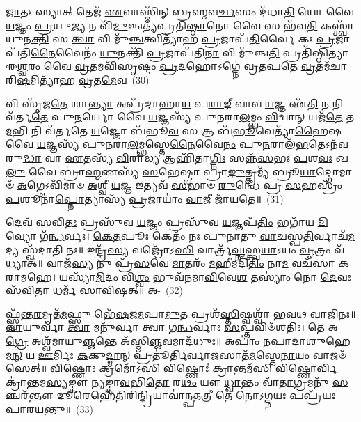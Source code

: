 \-\ul{𑌜𑌾}\-𑌤𑌃 𑌸𑍍𑌯𑌾𑌤𑍍 𑌤𑍇𑌜᳴ \ul{𑌏}\-𑌵𑌾𑌸𑍍𑌮𑌿᳴𑌨𑍍 𑌬𑍍𑌰𑌹𑍍𑌮𑌵\-\ul{𑌰𑍍𑌚}\-𑌸𑌂 𑌦᳴𑌧𑌾\-\ul{𑌤𑌿} 𑌯𑍋 𑌵𑍈 \ul{𑌯}\-𑌜𑍍𑌞𑌂 \ul{𑌪𑍍𑌰}\-𑌯𑍁\-\ul{𑌜𑍍𑌯} 𑌨 𑌵𑌿᳴\-\ul{𑌮𑍁}\-𑌞𑍍𑌚𑌤𑍍𑌯᳴𑌪𑍍𑌰𑌤𑌿\-\ul{𑌷𑍍𑌠𑌾}\-𑌨𑍋 𑌵𑍈 𑌸 𑌭᳴𑌵\-\ul{𑌤𑌿} 𑌕𑌸𑍍𑌤𑍍𑌵𑌾᳴ 𑌯𑍁𑌨\-\ul{𑌕𑍍𑌤𑌿} 𑌸 \ul{𑌤𑍍𑌵𑌾} 𑌵𑌿 𑌮𑍁᳴\-\ul{𑌞𑍍𑌚}\-𑌤𑍍𑌵𑌿𑌤𑍍𑌯𑌾᳴𑌹 \ul{𑌪𑍍𑌰}\-𑌜𑌾𑌪᳴\-\ul{𑌤𑌿}\-𑌰𑍍𑌵𑍈 𑌕𑌃 \ul{𑌪𑍍𑌰}\-𑌜𑌾𑌪᳴𑌤𑌿\-\ul{𑌨𑍈}\-𑌵𑍈𑌨𑌂᳴ \ul{𑌯𑍁}\-𑌨𑌕𑍍𑌤𑌿᳴ \ul{𑌪𑍍𑌰}\-𑌜𑌾𑌪᳴𑌤𑌿\-\ul{𑌨𑌾} 𑌵𑌿 𑌮𑍁᳴𑌞𑍍𑌚\-\ul{𑌤𑌿} 𑌪𑍍𑌰𑌤𑌿᳴𑌷𑍍𑌠𑌿𑌤𑍍𑌯𑌾 𑌈\-\ul{𑌶𑍍𑌵}\-𑌰𑌂 𑌵𑍈 \ul{𑌵𑍍𑌰}\-𑌤𑌮𑌵𑌿᳴𑌸𑍃𑌷𑍍𑌟𑌂 \ul{𑌪𑍍𑌰}\-𑌦𑌹𑍋\-𑌽𑌗𑍍𑌨𑍇॑ 𑌵𑍍𑌰𑌤𑌪𑌤𑍇 \ul{𑌵𑍍𑌰}\-𑌤𑌮᳴𑌚𑌾𑌰𑌿\-\ul{𑌷}\-𑌮𑌿𑌤𑍍𑌯𑌾᳴𑌹 \ul{𑌵𑍍𑌰}\-𑌤\-\ul{𑌮𑍇}\-𑌵~(30)

𑌵𑌿 𑌸𑍃᳴𑌜\-\ul{𑌤𑍇} 𑌶𑌾\-\ul{𑌨𑍍𑌤𑍍𑌯𑌾} 𑌅𑌪𑍍𑌰᳴𑌦𑌾𑌹𑌾\-\ul{𑌯} 𑌪\-\ul{𑌰𑌾}\-\-\ul{𑌙𑍍} 𑌵𑌾𑌵 \ul{𑌯}\-𑌜𑍍𑌞 𑌏᳴\-\ul{𑌤𑌿} 𑌨 𑌨𑌿 𑌵᳴𑌰𑍍𑌤\-\ul{𑌤𑍇} 𑌪𑍁\-\ul{𑌨}\-𑌰𑍍𑌯𑍋 𑌵𑍈 \ul{𑌯}\-𑌜𑍍𑌞𑌸𑍍𑌯᳴ 𑌪𑍁𑌨𑌰𑌾\-\ul{𑌲}\-𑌮𑍍𑌭𑌂 \ul{𑌵𑌿}\-𑌦𑍍𑌵𑌾𑌨𑍍 𑌯𑌜᳴\-\ul{𑌤𑍇} 𑌤\-\ul{𑌮}\-𑌭𑌿 𑌨𑌿 𑌵᳴𑌰𑍍𑌤𑌤𑍇 \ul{𑌯}\-𑌜𑍍𑌞𑍋 𑌬᳴𑌭𑍂\-\ul{𑌵} 𑌸 𑌆 𑌬᳴\-\ul{𑌭𑍂}\-𑌵𑍇𑌤𑍍𑌯𑌾᳴\-\ul{𑌹𑍈}\-𑌷 𑌵𑍈 \ul{𑌯}\-𑌜𑍍𑌞𑌸𑍍𑌯᳴ 𑌪𑍁𑌨𑌰𑌾\-\ul{𑌲}\-𑌮𑍍𑌭𑌸𑍍𑌤𑍇\-\ul{𑌨𑍈}\-𑌵𑍈\-\ul{𑌨𑌂} 𑌪𑍁\-\ul{𑌨}\-𑌰𑌾𑌲᳴\-\ul{𑌭}\-𑌤𑍇\-𑌽𑌨᳴𑌵𑌰𑍁\-\ul{𑌦𑍍𑌧𑌾} 𑌵𑌾 \ul{𑌏}\-𑌤𑌸𑍍𑌯᳴ \ul{𑌵𑌿}\-𑌰𑌾𑌡𑍍𑌯 𑌆𑌹𑌿᳴𑌤𑌾\-\ul{𑌗𑍍𑌨𑌿𑌃} 𑌸𑌨𑍍𑌨᳴\-\ul{𑌸}\-𑌭𑌃 \ul{𑌪}\-𑌶\-\ul{𑌵𑌃} 𑌖\-\ul{𑌲𑍁} 𑌵𑍈 𑌬𑍍𑌰𑌾॑\-\ul{𑌹𑍍𑌮}\-𑌣𑌸𑍍𑌯᳴ \ul{𑌸}\-𑌭𑍇𑌷𑍍𑌟𑍍𑌵𑌾 𑌪𑍍𑌰𑌾\-\ul{𑌙𑍁}\-𑌤𑍍𑌕𑍍𑌰𑌮𑍍𑌯᳴ 𑌬𑍍𑌰𑍂\-\ul{𑌯𑌾}\-𑌦𑍍𑌗𑍋𑌮𑌾𑍞᳴ \ul{𑌅}\-𑌗𑍍𑌨𑍇\-𑌽𑌵𑌿᳴𑌮𑌾𑍞 \ul{𑌅}\-𑌶𑍍𑌵𑍀 \ul{𑌯}\-𑌜𑍍𑌞 𑌇𑌤𑍍𑌯𑌵᳴ \ul{𑌸}\-𑌭𑌾𑍞 \ul{𑌰𑍁}\-𑌨𑍍𑌧𑍇 𑌪𑍍𑌰 \ul{𑌸}\-𑌹𑌸𑍍𑌰𑌂᳴ \ul{𑌪}\-𑌶𑍂𑌨𑌾॑\-\ul{𑌪𑍍𑌨𑍋}\-𑌤𑍍𑌯𑌾𑌸𑍍𑌯᳴ \ul{𑌪𑍍𑌰}\-𑌜𑌾𑌯𑌾𑌂॑ \ul{𑌵𑌾}\-𑌜𑍀 𑌜𑌾᳴𑌯𑌤𑍇॥~(31)

{\anuvakamend[{𑌯𑌃 𑌸 \ul{𑌮𑌾}\-𑌶𑌿𑌷𑌂᳴ 𑌗𑍃𑌹𑌪\-\ul{𑌤} 𑌇𑌤𑍍𑌯𑌾᳴\-\ul{𑌹} 𑌯𑌸𑍍𑌯᳴ \ul{𑌪𑍁}\-𑌤𑍍𑌰𑍋 \ul{𑌵𑍍𑌰}\-𑌤\-\ul{𑌮𑍇}\-𑌵 𑌖\-\ul{𑌲𑍁} 𑌵𑍈 𑌚𑌤𑍁᳴𑌰𑍍𑌵𑌿𑍞𑌶𑌤𑌿𑌶𑍍𑌚}]}%

𑌦𑍇𑌵᳴ 𑌸𑌵𑌿\-\ul{𑌤𑌃} 𑌪𑍍𑌰𑌸𑍁᳴𑌵 \ul{𑌯}\-𑌜𑍍𑌞𑌂 𑌪𑍍𑌰𑌸𑍁᳴𑌵 \ul{𑌯}\-𑌜𑍍𑌞𑌪᳴\-\ul{𑌤𑌿𑌂} 𑌭𑌗𑌾᳴𑌯 \ul{𑌦𑌿}\-𑌵𑍍𑌯𑍋 𑌗᳴\-\ul{𑌨𑍍𑌧}\-𑌰𑍍𑌵𑌃। \ul{𑌕𑍇}\-\-\ul{𑌤}\-𑌪𑍂𑌃 𑌕𑍇𑌤𑌂᳴ 𑌨𑌃 𑌪𑍁𑌨𑌾𑌤𑍁 \ul{𑌵𑌾}\-𑌚𑌸𑍍𑌪\-\ul{𑌤𑌿}\-𑌰𑍍𑌵𑌾𑌚᳴\-\ul{𑌮}\-𑌦𑍍𑌯 𑌸𑍍𑌵᳴𑌦𑌾𑌤𑌿 𑌨𑌃॥ 𑌇𑌨𑍍𑌦𑍍𑌰᳴\-\ul{𑌸𑍍𑌯} 𑌵𑌜𑍍𑌰𑍋᳴\-𑌽\-\ul{𑌸𑌿} 𑌵𑌾𑌰𑍍𑌤𑍍𑌰᳴\-\ul{𑌘𑍍𑌨}\-𑌸𑍍𑌤𑍍𑌵\-\ul{𑌯𑌾}\-\-𑌽𑌯𑌂 \ul{𑌵𑍃}\-𑌤𑍍𑌰𑌂 𑌵᳴𑌧𑍍𑌯𑌾𑌤𑍍॥ 𑌵𑌾𑌜᳴\-\ul{𑌸𑍍𑌯} 𑌨𑍁 𑌪𑍍𑌰᳴\-\ul{𑌸}\-𑌵𑍇 \ul{𑌮𑌾}\-𑌤𑌰𑌂᳴ \ul{𑌮}\-𑌹𑍀𑌮𑌦𑌿᳴\-\ul{𑌤𑌿𑌂} 𑌨𑌾\-\ul{𑌮} 𑌵𑌚᳴𑌸𑌾 𑌕𑌰𑌾𑌮𑌹𑍇। 𑌯𑌸𑍍𑌯𑌾᳴\-\ul{𑌮𑌿}\-𑌦𑌂 𑌵𑌿\-\ul{𑌶𑍍𑌵𑌂} 𑌭𑍁𑌵᳴𑌨𑌮𑌾\-\ul{𑌵𑌿}\-𑌵𑍇\-\ul{𑌶} 𑌤𑌸𑍍𑌯𑌾𑌂॑ 𑌨𑍋 \ul{𑌦𑍇}\-𑌵𑌃 𑌸᳴\-\ul{𑌵𑌿}\-𑌤𑌾 𑌧𑌰𑍍𑌮᳴ 𑌸𑌾𑌵𑌿𑌷𑌤𑍍॥ \ul{𑌅}\--~(32)

𑌫𑍍𑌸𑍍𑌵᳴𑌨𑍍𑌤\-\ul{𑌰}\-𑌮𑍃𑌤᳴\-\ul{𑌮}\-𑌫𑍍𑌸𑍁 𑌭𑍇᳴\-\ul{𑌷}\-𑌜\-\ul{𑌮}\-𑌪𑌾\-\ul{𑌮𑍁}\-𑌤 𑌪𑍍𑌰𑌶᳴\-\ul{𑌸𑍍𑌤𑌿}\-𑌷𑍍𑌵𑌶𑍍𑌵𑌾᳴ 𑌭𑌵𑌥 𑌵𑌾𑌜𑌿𑌨𑌃॥ \ul{𑌵𑌾}\-𑌯𑍁𑌰𑍍𑌵𑌾॑ \ul{𑌤𑍍𑌵𑌾} 𑌮𑌨𑍁᳴𑌰𑍍𑌵𑌾 𑌤𑍍𑌵𑌾 𑌗\-\ul{𑌨𑍍𑌧}\-𑌰𑍍𑌵𑌾𑌃 \ul{𑌸}\-𑌪𑍍𑌤𑌵𑌿𑍞᳴𑌶𑌤𑌿𑌃। 𑌤𑍇 𑌅\-\ul{𑌗𑍍𑌰𑍇} 𑌅𑌶𑍍𑌵᳴𑌮𑌾𑌯𑍁\-\ul{𑌞𑍍𑌜}\-𑌨𑍍𑌤𑍇 𑌅᳴𑌸𑍍𑌮𑌿\-\ul{𑌞𑍍𑌜}\-𑌵𑌮𑌾𑌦᳴𑌧𑍁𑌃॥ 𑌅𑌪𑌾𑌂॑ 𑌨𑌪𑌾𑌦𑌾𑌶𑍁𑌹𑍇\-\ul{𑌮}\-\-\ul{𑌨𑍍} 𑌯 \ul{𑌊}\-𑌰𑍍𑌮𑌿𑌃 \ul{𑌕}\-𑌕𑍁\-\ul{𑌦𑍍𑌮𑌾}\-𑌨𑍍 𑌪𑍍𑌰𑌤𑍂॑𑌰𑍍𑌤𑌿𑌰𑍍𑌵𑌾\-\ul{𑌜}\-𑌸𑌾𑌤᳴\-\ul{𑌮}\-𑌸𑍍𑌤𑍇\-\ul{𑌨𑌾}\-𑌯𑌂 𑌵𑌾𑌜𑍞᳴ 𑌸𑍇𑌤𑍍॥ 𑌵𑌿\-\ul{𑌷𑍍𑌣𑍋𑌃} 𑌕𑍍𑌰𑌮𑍋᳴\-𑌽\-\ul{𑌸𑌿} 𑌵𑌿𑌷𑍍𑌣𑍋𑌃॑ \ul{𑌕𑍍𑌰𑌾}\-𑌨𑍍𑌤𑌮᳴\-\ul{𑌸𑌿} 𑌵𑌿\-\ul{𑌷𑍍𑌣𑍋}\-𑌰𑍍𑌵𑌿𑌕𑍍𑌰𑌾॑𑌨𑍍𑌤𑌮\-\ul{𑌸𑍍𑌯}\-𑌙𑍍𑌕𑍗 \ul{𑌨𑍍𑌯}\-𑌙𑍍𑌕𑌾\-\ul{𑌵}\-𑌭𑌿\-\ul{𑌤𑍋} 𑌰\-\ul{𑌥𑌂} 𑌯𑍗 \ul{𑌧𑍍𑌵𑌾}\-𑌨𑍍𑌤𑌂 𑌵𑌾᳴\-\ul{𑌤𑌾}\-𑌗𑍍𑌰𑌮𑌨𑍁᳴ \ul{𑌸}\-𑌞𑍍𑌚𑌰᳴𑌨𑍍𑌤𑍗 \ul{𑌦𑍂}\-𑌰𑍇𑌹𑍇᳴𑌤𑌿𑌰𑌿\-\ul{𑌨𑍍𑌦𑍍𑌰𑌿}\-𑌯𑌾𑌵𑌾॑𑌨𑍍𑌪\-\ul{𑌤}\-𑌤𑍍𑌰𑍀 𑌤𑍇 \ul{𑌨𑍋}\-\-𑌽𑌗𑍍𑌨\-\ul{𑌯𑌃} 𑌪𑌪𑍍𑌰᳴𑌯𑌃 𑌪𑌾𑌰𑌯𑌨𑍍𑌤𑍁॥~(33)

